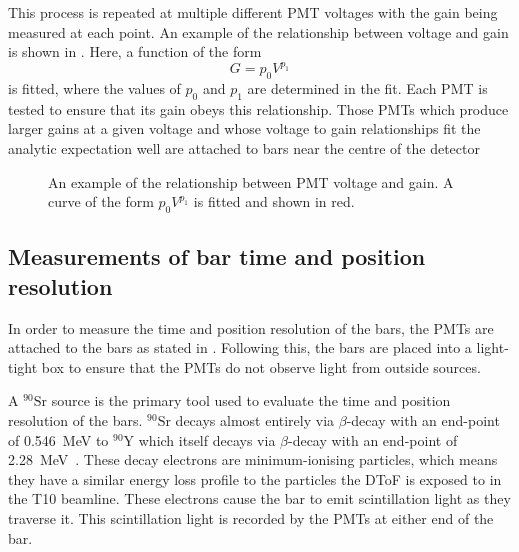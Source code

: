This process is repeated at multiple different PMT voltages with the gain being measured at each point.
An example of the relationship between voltage and gain is shown in .
Here, a function of the form
\begin{equation}
  G = p_{0} V^{p_{1}}
  \label{eq:gain}
\end{equation}
is fitted, where the values of $p_{0}$ and $p_{1}$ are determined in the fit.
Each PMT is tested to ensure that its gain obeys this relationship.
Those PMTs which produce larger gains at a given voltage and whose voltage to gain relationships fit the analytic expectation well are attached to bars near the centre of the detector

\begin{figure}[h]
  \centering
  \begin{adjustbox}{max totalsize={.8\textwidth}, center}
    
  \end{adjustbox}
  \caption[Example of relationship between PMT voltage and gain.]{An example of the relationship between PMT voltage and gain. A curve of the form $p_{0} V^{p_{1}}$ is fitted and shown in red.}
  \label{fig:gainEx}
\end{figure}

\subsection{Measurements of bar time and position resolution}
\label{sec:hptpc_dtof_characterisation:characterisation:barRes}

In order to measure the time and position resolution of the bars, the PMTs are attached to the bars as stated in .
Following this, the bars are placed into a light-tight box to ensure that the PMTs do not observe light from outside sources.

A $^{90}\text{Sr}$ source is the primary tool used to evaluate the time and position resolution of the bars.
$^{90}\text{Sr}$ decays almost entirely via $\beta$-decay with an end-point of \SI{0.546}{\mega\electronvolt} to $^{90}\text{Y}$ which itself decays via $\beta$-decay with an end-point of \SI{2.28}{\mega\electronvolt}~\cite{strontium}.
These decay electrons are minimum-ionising particles, which means they have a similar energy loss profile to the particles the DToF is exposed to in the T10 beamline.
These electrons cause the bar to emit scintillation light as they traverse it.
This scintillation light is recorded by the PMTs at either end of the bar.

